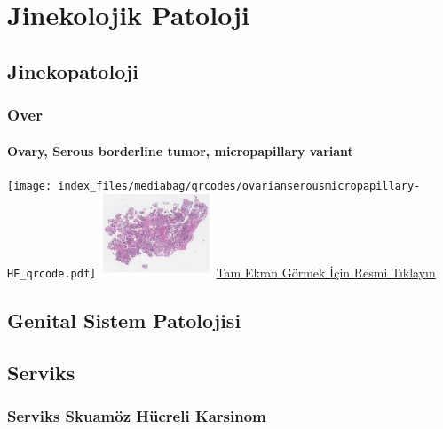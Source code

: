 \documentclass[
  letterpaper,
  DIV=11,
  numbers=noendperiod]{scrreprt}
\begin{document}
\part{Jinekolojik Patoloji}

\hypertarget{sec-jinekopatoloji}{%
\chapter{Jinekopatoloji}\label{sec-jinekopatoloji}}

\hypertarget{sec-over}{%
\section{Over}\label{sec-over}}

\hypertarget{sec-ovary-serous-borderline-micropapillary}{%
\subsection{Ovary, Serous borderline tumor, micropapillary
variant}\label{sec-ovary-serous-borderline-micropapillary}}

\texttt{[image: index\_files/mediabag/qrcodes/ovarianserousmicropapillary-HE\_qrcode.pdf]}
\href{https://images.patolojiatlasi.com/ovarianserousmicropapillary/HE.html}{\includegraphics[width=0.25\textwidth,height=\textheight]{./screenshots/thumbnail_ovarianserousmicropapillary.png}}
\href{https://images.patolojiatlasi.com/ovarianserousmicropapillary/HE.html}{Tam
Ekran Görmek İçin Resmi Tıklayın}

\hypertarget{sec-genital-sistem-patolojisi}{%
\chapter{Genital Sistem
Patolojisi}\label{sec-genital-sistem-patolojisi}}

\hypertarget{sec-serviks}{%
\chapter{Serviks}\label{sec-serviks}}

\hypertarget{sec-serviks-skuamoz-hucreli-karsinom}{%
\section{Serviks Skuamöz Hücreli
Karsinom}\label{sec-serviks-skuamoz-hucreli-karsinom}}
\end{document}
